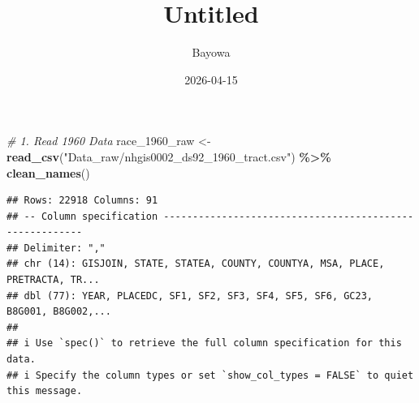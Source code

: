 \documentclass[
]{article}
\title{Untitled}
\author{Bayowa}
\date{2026-04-15}
\newenvironment{Shaded}{\begin{snugshade}}{\end{snugshade}}
\newcommand{\CommentTok}[1]{\textcolor[rgb]{0.56,0.35,0.01}{\textit{#1}}}
\newcommand{\FunctionTok}[1]{\textcolor[rgb]{0.13,0.29,0.53}{\textbf{#1}}}
\newcommand{\NormalTok}[1]{#1}
\newcommand{\OtherTok}[1]{\textcolor[rgb]{0.56,0.35,0.01}{#1}}
\newcommand{\SpecialCharTok}[1]{\textcolor[rgb]{0.81,0.36,0.00}{\textbf{#1}}}
\newcommand{\StringTok}[1]{\textcolor[rgb]{0.31,0.60,0.02}{#1}}
\begin{document}
\maketitle

\begin{Shaded}
\begin{Highlighting}[]
\CommentTok{\# 1. Read 1960 Data}
\NormalTok{race\_1960\_raw }\OtherTok{\textless{}{-}} \FunctionTok{read\_csv}\NormalTok{(}\StringTok{"Data\_raw/nhgis0002\_ds92\_1960\_tract.csv"}\NormalTok{) }\SpecialCharTok{\%\textgreater{}\%}
  \FunctionTok{clean\_names}\NormalTok{()}
\end{Highlighting}
\end{Shaded}

\begin{verbatim}
## Rows: 22918 Columns: 91
## -- Column specification --------------------------------------------------------
## Delimiter: ","
## chr (14): GISJOIN, STATE, STATEA, COUNTY, COUNTYA, MSA, PLACE, PRETRACTA, TR...
## dbl (77): YEAR, PLACEDC, SF1, SF2, SF3, SF4, SF5, SF6, GC23, B8G001, B8G002,...
## 
## i Use `spec()` to retrieve the full column specification for this data.
## i Specify the column types or set `show_col_types = FALSE` to quiet this message.
\end{verbatim}
\end{document}
